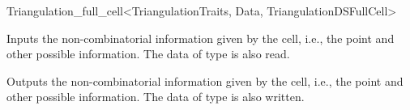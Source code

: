 \begin{ccRefClass}{Triangulation_full_cell<TriangulationTraits, Data, TriangulationDSFullCell>}

\ccGlue{}


%
{Inputs the non-combinatorial information given by the cell, {i.e.},
the point and other possible information. The data of type  is
{also} read.}

%
{Outputs the non-combinatorial information given by the cell, {i.e.},
the point and other possible information. The data of type  is
{also} written.}

\ccSeeAlso


\end{ccRefClass}
